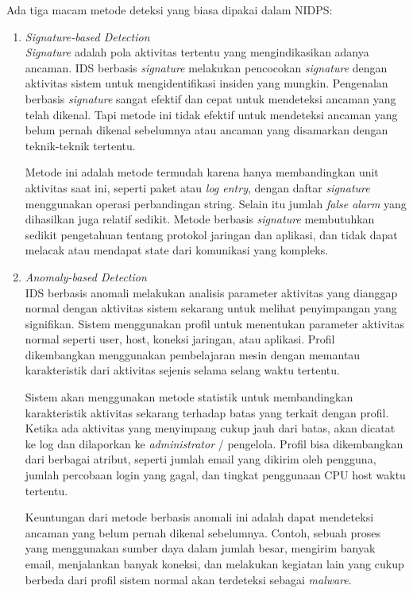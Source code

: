     Ada tiga macam metode deteksi yang biasa dipakai dalam NIDPS:
    \begin{enumerate}

      \item
      \emph{Signature-based Detection} \\
      \emph{Signature} adalah pola aktivitas tertentu yang mengindikasikan adanya ancaman. IDS berbasis \emph{signature} melakukan pencocokan \emph{signature} dengan aktivitas sistem untuk mengidentifikasi insiden yang mungkin. Pengenalan berbasis \emph{signature} sangat efektif dan cepat untuk mendeteksi ancaman yang telah dikenal. Tapi metode ini tidak efektif untuk mendeteksi ancaman yang belum pernah dikenal sebelumnya atau ancaman yang disamarkan dengan teknik-teknik tertentu.

      Metode ini adalah metode termudah karena hanya membandingkan unit aktivitas saat ini, seperti paket atau \emph{log entry}, dengan daftar \emph{signature} menggunakan operasi perbandingan string. Selain itu jumlah \emph{false alarm} yang dihasilkan juga relatif sedikit. Metode berbasis \emph{signature} membutuhkan sedikit pengetahuan tentang protokol jaringan dan aplikasi, dan tidak dapat melacak atau mendapat state dari komunikasi yang kompleks.

      \item
      \emph{Anomaly-based Detection} \\
      IDS berbasis anomali melakukan analisis parameter aktivitas yang dianggap normal dengan aktivitas sistem sekarang untuk melihat penyimpangan yang signifikan. Sistem menggunakan profil untuk menentukan parameter aktivitas normal seperti user, host, koneksi jaringan, atau aplikasi. Profil dikembangkan menggunakan pembelajaran mesin dengan memantau karakteristik dari aktivitas sejenis selama selang waktu tertentu.

      Sistem akan menggunakan metode statistik untuk membandingkan karakteristik aktivitas sekarang terhadap batas yang terkait dengan profil. Ketika ada aktivitas yang menyimpang cukup jauh dari batas, akan dicatat ke log dan dilaporkan ke \emph{administrator} / pengelola. Profil bisa dikembangkan dari berbagai atribut, seperti jumlah email yang dikirim oleh pengguna, jumlah percobaan login yang gagal, dan tingkat penggunaan CPU host waktu tertentu.

      Keuntungan dari metode berbasis anomali ini adalah dapat mendeteksi ancaman yang belum pernah dikenal sebelumnya. Contoh, sebuah proses yang menggunakan sumber daya dalam jumlah besar, mengirim banyak email, menjalankan banyak koneksi, dan melakukan kegiatan lain yang cukup berbeda dari profil sistem normal akan terdeteksi sebagai \emph{malware}.


\end{enumerate}
